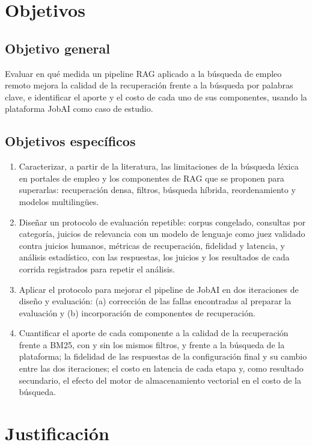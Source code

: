 \section{Objetivos}

\subsection{Objetivo general}

Evaluar en qué medida un pipeline RAG aplicado a la búsqueda de empleo remoto mejora la calidad de la recuperación frente a la búsqueda por palabras clave, e identificar el aporte y el costo de cada uno de sus componentes, usando la plataforma JobAI como caso de estudio.

\subsection{Objetivos específicos}

\begin{enumerate}
    \item Caracterizar, a partir de la literatura, las limitaciones de la búsqueda léxica en portales de empleo y los componentes de RAG que se proponen para superarlas: recuperación densa, filtros, búsqueda híbrida, reordenamiento y modelos multilingües.
    \item Diseñar un protocolo de evaluación repetible: corpus congelado, consultas por categoría, juicios de relevancia con un modelo de lenguaje como juez validado contra juicios humanos, métricas de recuperación, fidelidad y latencia, y análisis estadístico, con las respuestas, los juicios y los resultados de cada corrida registrados para repetir el análisis.
    \item Aplicar el protocolo para mejorar el pipeline de JobAI en dos iteraciones de diseño y evaluación: (a) corrección de las fallas encontradas al preparar la evaluación y (b) incorporación de componentes de recuperación.
    \item Cuantificar el aporte de cada componente a la calidad de la recuperación frente a BM25, con y sin los mismos filtros, y frente a la búsqueda de la plataforma; la fidelidad de las respuestas de la configuración final y su cambio entre las dos iteraciones; el costo en latencia de cada etapa y, como resultado secundario, el efecto del motor de almacenamiento vectorial en el costo de la búsqueda.
\end{enumerate}

\section{Justificación}

